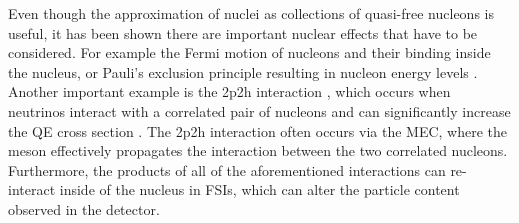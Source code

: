 




Even though the approximation of nuclei as collections of quasi-free nucleons is useful, it has been shown \cite{MiniBooNE2p2hExperimentalDiscrepancy2010.pdf} there are important nuclear effects that have to be considered. For example the Fermi motion of nucleons and their binding inside the nucleus, or Pauli's exclusion principle resulting in nucleon energy levels \cite{NeutrinoIntOverview2022.pdf}. Another important example is the \gls{2p2h} interaction \cite{FirstUseOfMEC2009.pdf, FirstUseOfMEC2010.pdf, FirstUseOfMEC2011.pdf}, which occurs when neutrinos interact with a correlated pair of nucleons and can significantly increase the \gls{QE} cross section \cite{NeutrinoIntOverview2022.pdf}. The \gls{2p2h} interaction often occurs via the \gls{MEC}, where the meson effectively propagates the interaction between the two correlated nucleons. Furthermore, the products of all of the aforementioned interactions can re-interact inside of the nucleus in \glspl{FSI}, which can alter the particle content observed in the detector.

